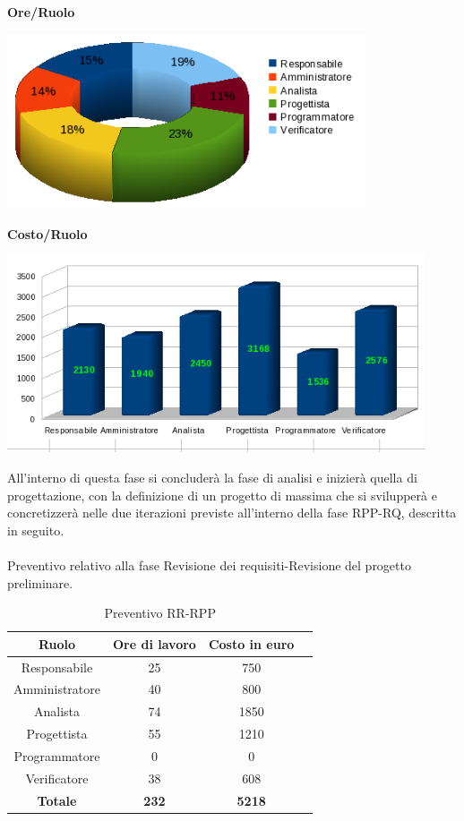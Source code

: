 \newpage
\begin{center}\textbf{Ore/Ruolo}
\end{center}
\includegraphics[width=300pt]{Ore_Totali}

\begin{center}\textbf{Costo/Ruolo}
\end{center}
\includegraphics[width=350pt]{Costi_Totali}

All'interno di questa fase si concluder\`a la fase di analisi e inizier\`a quella di progettazione, con la definizione di un progetto di massima che si svilupper\`a e concretizzer\`a nelle due iterazioni previste all'interno della fase RPP-RQ, descritta in seguito. \\
\\
Preventivo relativo alla fase Revisione dei requisiti-Revisione del progetto preliminare.
\begin{table}[h]
	\begin{center}
		  \begin{tabular}{|c|c|c|c|}
		 \hline 
		 \textbf{Ruolo} & \textbf{Ore di lavoro} & \textbf{Costo in euro}\\
		 \hline
		Responsabile & 25 & 750 \\
		Amministratore & 40 & 800\\
		Analista & 74 & 1850\\
		Progettista & 55 & 1210\\
		Programmatore & 0 & 0 \\
		Verificatore & 38 & 608\\
        \hline
        \textbf{Totale} & \textbf{232} & \textbf{5218}\\
		\hline
		\end{tabular}
	\caption{Preventivo RR-RPP} 
	\label{tab:tabella_RR-RPP}
	\end{center}	
\end{table}

